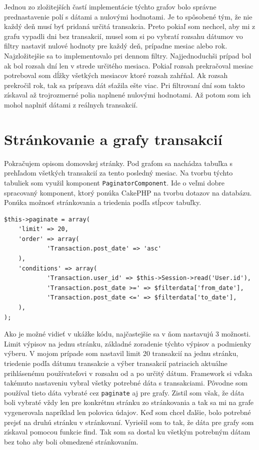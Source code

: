 \documentclass[12pt,oneside]{book}
\begin{document}
Jednou zo zložitejších častí implementácie týchto grafov bolo správne prednastavenie polí s dátami a nulovými hodnotami. Je to spôsobené tým, že nie každý deň musí byť pridaná určitá transakcia. Preto pokiaľ som nechcel, aby mi z grafu vypadli dni bez transakcií, musel som si po vybratí rozsahu dátumov vo filtry nastaviť nulové hodnoty pre každý deň, prípadne mesiac alebo rok. Najzložitejšie sa to implementovalo pri dennom filtry. Najjednoduchši prípad bol ak bol rozsah dní len v strede určitého mesiaca. Pokiaľ rozsah prekračoval mesiac potreboval som dĺžky všetkých mesiacov ktoré rozsah zahŕňal. Ak rozsah prekročil rok, tak sa príprava dát sťažila ešte viac. Pri filtrovaní dní som takto získaval až trojrozmerné polia naplnené nulovými hodnotami. Až potom som ich mohol naplniť dátami z reálnych transakcií.




\section{Stránkovanie a grafy transakcií}
Pokračujem opisom domovskej stránky. Pod grafom sa nachádza tabuľka s prehľadom všetkých transakcií za tento posledný mesiac. Na tvorbu týchto tabuliek som využil komponent \texttt{PaginatorComponent}. Ide o veľmi dobre spracovaný komponent, ktorý ponúka CakePHP na tvorbu dotazov na databázu. Ponúka možnosť stránkovania a triedenia podľa stĺpcov tabuľky. 
\begin{lstlisting}
$this->paginate = array(
	'limit' => 20,
	'order' => array(
			'Transaction.post_date' => 'asc'
	),
	'conditions' => array(
			'Transaction.user_id' => $this->Session->read('User.id'),
			'Transaction.post_date >=' => $filterdata['from_date'],
			'Transaction.post_date <=' => $filterdata['to_date'],
	),
); 
\end{lstlisting}
Ako je možné vidieť v ukážke kódu, najčastejšie sa v ňom nastavujú 3 možnosti. Limit výpisov na jednu stránku, základné zoradenie týchto výpisov a podmienky výberu. V mojom prípade som nastavil limit 20 transakcií na jednu stránku, triedenie podľa dátumu transakcie a výber transakcií patriacich aktuálne prihlásenému používateľovi v rozsahu od a po určitý dátum. Framework si vďaka takémuto nastaveniu vybral všetky potrebné dáta s transakciami. Pôvodne som používal tieto dáta vybraté cez \texttt{paginate} aj pre grafy. Zistil som však, že dáta boli vybraté vždy len pre konkrétnu stránku zo stránkovania a tak sa mi na grafe vygenerovala napríklad len polovica údajov. Keď som chcel ďalšie, bolo potrebné prejsť na druhú stránku v stránkovaní. Vyriešil som to tak, že dáta pre grafy som získaval pomocou funkcie find. Tak som sa dostal ku všetkým potrebným dátam bez toho aby boli obmedzené stránkovaním.  
\end{document}
